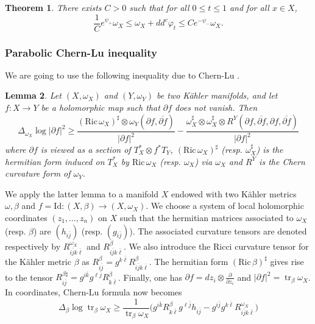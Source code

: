 \documentclass[a4paper,11pt,leqno,english]{smfart}
\theoremstyle{plain}
\newtheorem{thm}{Theorem}[section]
\theoremstyle{plain}
\numberwithin{equation}{section} %
\numberwithin{figure}{section} %
\theoremstyle{plain}
\theoremstyle{plain}
\newtheorem{lem}[thm]{Lemma} %
\theoremstyle{remark}
\theoremstyle{remark}
\theoremstyle{definition}
\theoremstyle{plain}
\theoremstyle{plain}
\theoremstyle{definition}
\newcommand{\om}{\omega}
\newcommand{\f}{\varphi}
\newcommand{\p}{\psi}
\newcommand{\Ric}{\mathrm{Ric} \,}
\renewcommand{\ge}{\geq}
\newcommand{\tr}{\operatorname{tr}}
\begin{document}
\begin{thm} \label{thm:laplace}
There exists $C>0$ such that for all $0 \leq t \leq 1$ and for all $x \in X$,
$$
\frac{1}{C} e^{\p_+} \omega_X \leq \omega_X+dd^c \f_t \leq C e^{-\p_-} \omega_X.
$$
\end{thm}
 
 
 \subsubsection{Parabolic Chern-Lu inequality}
 
 
 
 We are going to use  the following inequality due to Chern-Lu \cite{Chern, Lu}.

\begin{lem} \label{lem:chernlu}
 Let $(X,\om_X)$ and $(Y, \om_Y)$ be two Kähler manifolds, and let $f:X\to Y$ be a holomorphic map such that $\partial f$ does not vanish. Then 
\[  \Delta_{\omega_X} \log |\partial f|^2 \ge \frac{(\Ric \om_X)^{\sharp} \otimes \om_Y(\partial f, \overline {\partial f})}{|\partial f|^2}-\frac{ \om_X^{\sharp}\otimes \om_X^{\sharp} \otimes R^Y(\partial  f, \overline {\partial  f},\partial  f, \overline {\partial  f})}{|\partial f|^2} \]
where $\partial  f$ is viewed as a section of $T^*_X \otimes f^*T_Y$, $(\Ric \om_X)^{\sharp}$ (resp. $\om_X^{\sharp}$) is the hermitian form induced on $T_X^*$ by $\Ric \om_X$ (resp. $\om_X$) via $\om_X$ and $R^Y$ is the Chern curvature form of $\om_Y$.
\end{lem}

We apply the latter lemma to a manifold $X$ endowed with two Kähler metrics $\om, \beta$ and $f=\mathrm{Id}:(X,\beta)\to (X,\om_X)$. We choose a system of local holomorphic coordinates $(z_1, \ldots, z_n)$ on $X$ such that the hermitian matrices associated to $\om_X$ (resp. $\beta$) are $(h_{i\bar j})$ (resp. $(g_{i\bar j})$). The associated curvature tensors are denoted respectively by $R_{i\bar j k \bar \ell}^{\om_X}$ and $R_{i\bar j k \bar \ell}^{\beta}$. We also introduce the Ricci curvature tensor for the Kähler metric $\beta$ as $R_{i\bar j}^{\beta}=g^{k \bar \ell} R^{\beta}_{i \bar j k \bar{ \ell}}$.  The hermitian form $(\Ric \beta)^{\sharp}$ gives rise to the tensor $R_{i\bar j}^{\beta \sharp}=g^{i \bar k}g^{\ell \bar j} R^{\beta}_{k \bar \ell}$. Finally, one has $\partial f = dz_i \otimes \frac{\partial}{\partial z_i}$ and $|\partial f|^2=\tr_{\beta}\om_X$.
In coordinates, Chern-Lu formula now becomes
\[
\Delta_{\beta} \log \tr_{\beta}\om_X \ge \frac{1}{\tr_\beta \om_X} \big( g^{i \bar k} R^{\beta}_{k \bar \ell} g^{\ell \bar j}h_{i\bar j}- g^{i \bar j}g^{k\bar \ell} R^{\om_X}_{i \bar j k \bar \ell} \big)
\]
\end{document}
